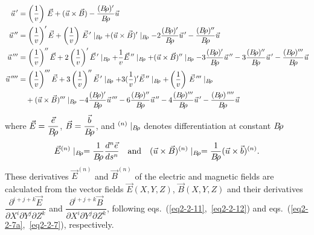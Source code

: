 \begin{equation}
	\begin{aligned}
		\vec  u^{\,\prime}    
		   & =  \left(\dfrac{1 }{ v}\right)\, \vec  E
		      + (\vec  u\times\vec  B) - 
		      \dfrac{(\Br )^\prime }{ \Br}  \vec  u \\
		\vec  u^{\,\prime\prime}  
		   &   =  \left(\dfrac{1 }{ v}\right)^\prime\vec  E 
		      + \left(\dfrac{1 }{ v}\right)\,\vec  E{^{\,\prime}} \mid_{ \Br} 
		      +(\vec u\times\vec  B)^\prime \mid_{ \Br}
		      -2 \dfrac{(\Br )^\prime }{ \Br} \vec  u^{\,\prime} 
		      - \dfrac{(\Br )^{\prime\prime} }{ \Br}  \vec  u \\
		\vec  u^{\,\prime\prime\prime} 
		   &  =   \left(\dfrac{1 }{v}\right)^{\prime\prime}\vec  E
		      +2 \left(\dfrac{1 }{ v}\right)^\prime\vec  E^{\,\prime} \mid_{ \Br}
		      +\dfrac{1 }{ v} \vec  E^{\,\prime\prime} \mid_{ \Br} 
		      +(\vec  u\times\vec B)^{\prime\prime} \mid_{ \Br}  
		      -3 \dfrac{(\Br )^\prime }{ \Br}  \vec u^{\,\prime\prime} 
		      -3 \dfrac{(\Br )^{\prime\prime} }{ \Br}  \vec  u^{\,\prime}
		      - \dfrac{(\Br )^{\prime\prime\prime} }{ \Br}  \vec  u \\
		\vec  u^{\quaprime}  
		   & =    \left(\dfrac{1}{ v}\right)^{\prime\prime\prime}  \vec  E
		      +3 \left(\dfrac{1 }{ v}\right)^{\prime\prime}\vec E^{\,\prime} \mid_{ \Br} 
		      +3( \dfrac{1 }{ v})^\prime\vec  E^{\,\prime\prime} \mid_{\Br} 
		      +\left(\dfrac{1 }{ v}\right)\, \vec  E^{\,\prime\prime\prime} \mid_{ \Br} \\
		  &  \quad + (\vec  u\times\vec B)^{\prime\prime\prime} \mid_{ \Br} 
		      -4 \dfrac{(\Br )^\prime }{ \Br}  \vec u^{\,\prime\prime\prime} 
		      -6 \dfrac{(\Br )^{\prime\prime} }{ \Br}  \vec u^{\,\prime\prime} 
		      -4 \dfrac{(\Br )^{\prime\prime\prime} }{ \Br}  \vec  u^{\,\prime} 
		      - \dfrac{(\Br )^{\quaprime} }{ \Br}  \vec  u
	\end{aligned}
	\label{eq2-2-19}
\end{equation}
%
\noindent where $ \vec  E =  \dfrac{\vec  e }{ B\!\rho} $, 
$ \vec  B =\dfrac{\vec  b }{ B\!\rho} $, and $^{(n)}\mid_{ B\!\rho} $ denotes differentiation at constant $ B\!\rho$ 
 \begin{equation}
	 \vec  E^{(n)}\mid_{ B\!\rho} = \dfrac{1 }{ B\!\rho}  \dfrac{d^n\vec  e }{ ds^n}
	 \quad \text{and} \quad 
	 (\vec  u\times\vec  B)^{(n)}\mid_{ B\!\rho} = \dfrac{1}{B\!\rho}  (\vec  u\times\vec  b)^{(n)}.
 	\label{eq2-2-20}
 \end{equation}
\noindent These derivatives $ \vec  E^{(n)} $ and $ \vec  B^{(n)} $ of the
electric and magnetic fields are 
calculated from the vector fields $ \vec  E(X,Y,Z)$,  $ \vec  B(X,Y,Z) $ and
their derivatives  
$ \dfrac{ \partial^{i+j+k} \vec  E }{ \partial X^i \partial Y^j\partial Z^k} $ 
and 
$ \dfrac{ \partial^{ i+j+k} \vec  B }{ \partial X^i \partial Y^j \partial Z^k}$, 
following eqs.~(\ref{eq2-2-11},~\ref{eq2-2-12}) and eqs.~(\ref{eq2-2-7a},~\ref{eq2-2-7}), respectively.


